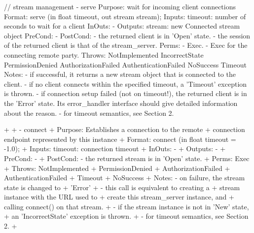 \begin{myspec}
 
    // stream management
    - serve
      Purpose:  wait for incoming client connections
      Format:   serve                (in  float   timeout,
                                      out stream  stream);
      Inputs:   timeout:              number of seconds to wait
                                      for a client
      InOuts:   -
      Outputs:  stream:               new Connected stream object
      PreCond:  -
      PostCond: - the returned client is in 'Open' state.
                - the session of the returned client is that of 
                  the stream_server.
      Perms:    - Exec.
                - Exec for the connecting remote party.
      Throws:   NotImplemented
                IncorrectState
                PermissionDenied
                AuthorizationFailed
                AuthenticationFailed
                NoSuccess
                Timeout
      Notes:    - if successful, it returns a new stream object
                  that is connected to the client.
                - if no client connects within the specified 
                  timeout, a 'Timeout' exception is thrown.
                - if connection setup failed (not on timeout!),
                  the returned client is in the 'Error' state.
                  Its error_handler interface should give
                  detailed information about the reason.
                - for timeout semantics, see Section 2.

+
+   - connect
+     Purpose:  Establishes a connection to the remote
+               connection endpoint represented by this instance
+     Format:   connect              (in float timeout = -1.0);
+     Inputs:   timeout:              connection timeout
+     InOuts:   -
+     Outputs:  -
+     PreCond:  - 
+     PostCond: - the returned stream is in 'Open' state.
+     Perms:    Exec
+     Throws:   NotImplemented
+               PermissionDenied
+               AuthorizationFailed
+               AuthenticationFailed
+               Timeout
+               NoSuccess
+     Notes:    - on failure, the stream state is changed to
+                 'Error'
+               - this call is equivalent to creating a
+                 stream instance with the URL used to
+                 create this stream_server instance, and 
+                 calling connect() on that stream.
+               - if the stream instance is not in 'New' state,
+                 an 'IncorrectState' exception is thrown.
+               - for timeout semantics, see Section 2.
+


\end{myspec}
